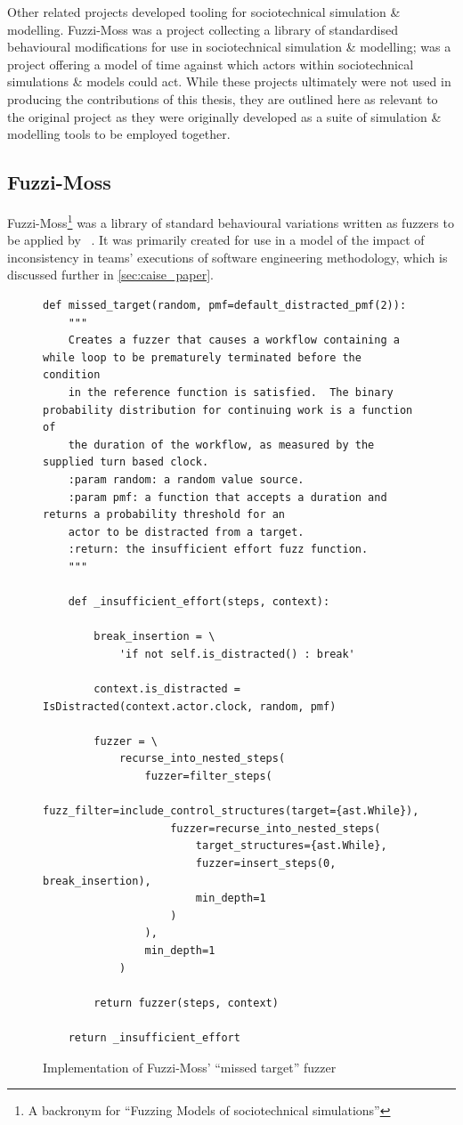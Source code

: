 Other related projects developed tooling for sociotechnical simulation \&
modelling. Fuzzi-Moss was a project collecting a library of standardised
behavioural modifications for use in sociotechnical simulation \& modelling;
\theatreag{} was a project offering a model of time against which actors within
sociotechnical simulations \& models could act. While these projects ultimately
were not used in producing the contributions of this thesis, they are outlined
here as relevant to the original \pdsf project as they were originally
developed as a suite of simulation \& modelling tools to be employed together.

\subsection{Fuzzi-Moss}\label{subsec:prior_work_fm}

Fuzzi-Moss\footnote{A backronym for ``Fuzzing Models of sociotechnical
simulations''} was a library of standard behavioural variations written as
fuzzers to be applied by \pdsf{}~\cite{fuzzimoss_repo}. It was primarily created
for use in a model of the impact of inconsistency in teams' executions of
software engineering methodology, which is discussed further in
\cref{sec:caise_paper}.

\begin{figure}
    \begin{lstlisting}[style=footnotesize_python]
def missed_target(random, pmf=default_distracted_pmf(2)):
    """
    Creates a fuzzer that causes a workflow containing a while loop to be prematurely terminated before the condition
    in the reference function is satisfied.  The binary probability distribution for continuing work is a function of
    the duration of the workflow, as measured by the supplied turn based clock.
    :param random: a random value source.
    :param pmf: a function that accepts a duration and returns a probability threshold for an
    actor to be distracted from a target.
    :return: the insufficient effort fuzz function.
    """

    def _insufficient_effort(steps, context):

        break_insertion = \
            'if not self.is_distracted() : break'

        context.is_distracted = IsDistracted(context.actor.clock, random, pmf)

        fuzzer = \
            recurse_into_nested_steps(
                fuzzer=filter_steps(
                    fuzz_filter=include_control_structures(target={ast.While}),
                    fuzzer=recurse_into_nested_steps(
                        target_structures={ast.While},
                        fuzzer=insert_steps(0, break_insertion),
                        min_depth=1
                    )
                ),
                min_depth=1
            )

        return fuzzer(steps, context)

    return _insufficient_effort
    \end{lstlisting}
    \caption{Implementation of Fuzzi-Moss' ``missed target'' fuzzer}
    \label{fig:fuzzimoss_missed_target_fuzzer}
\end{figure}

